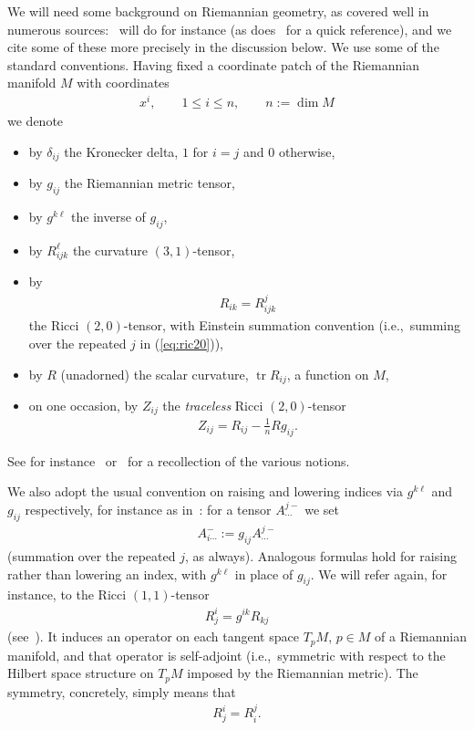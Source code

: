 \documentclass[pdftex]{sigma}%
\numberwithin{equation}{section}
\begin{document}
We will need some background on Riemannian geometry, as covered well in numerous sources:~\cite{berg-pan,bes,doC92,kn1,pet} will do for instance (as does~\cite[Appendix A]{ck-ric} for a quick reference), and we cite some of these more precisely in the discussion below. We use some of the standard conventions. Having fixed a coordinate patch of the Riemannian manifold $M$ with coordinates
\begin{gather*}
 x^i,\qquad 1\le i\le n,\qquad n:=\dim M
\end{gather*}
we denote
\begin{itemize}\itemsep=0pt
\item by $\delta_{ij}$ the Kronecker delta, $1$ for $i=j$ and $0$ otherwise,
\item by $g_{ij}$ the Riemannian metric tensor,
\item by $g^{k\ell}$ the inverse of $g_{ij}$,
\item by $R_{ijk}^{\ell}$ the curvature $(3,1)$-tensor,
\item by
 \begin{gather}
 R_{ik} = R_{ijk}^j\label{eq:ric20}
 \end{gather}
 the Ricci $(2,0)$-tensor, with Einstein summation convention (i.e.,~summing over the repe\-ated $j$ in (\ref{eq:ric20})),
\item by $R$ (unadorned) the scalar curvature, $\operatorname{tr} R_{ij}$, a function on $M$,
\item on one occasion, by $Z_{ij}$ the {\it traceless} Ricci $(2,0)$-tensor
 \begin{gather}\label{eq:trric}
 Z_{ij} = R_{ij} - \frac{1}{n} R g_{ij}.
 \end{gather}
\end{itemize}
See for instance~\cite[Chapter~1]{bes} or~\cite[Chapter~3]{pet} for a recollection of the various notions.


We also adopt the usual convention on raising and lowering indices via $g^{k\ell}$ and $g_{ij}$ respectively, for instance as in~\cite[Section~1.42]{bes}: for a tensor $A_{\cdots}^{j -}$ we set
\begin{gather*}
 A_{i\cdots}^{-}:=g_{ij}A_{\cdots}^{j -}
\end{gather*}
(summation over the repeated $j$, as always). Analogous formulas hold for raising rather than lowering an index, with $g^{k\ell}$ in place of $g_{ij}$. We will refer again, for instance, to the Ricci $(1,1)$-tensor
\begin{gather*}
 R^i_j = g^{ik}R_{kj}
\end{gather*}
(see~\cite[Remark 1.91]{bes}). It induces an operator on each tangent space $T_pM$, $p\in M$ of a Riemannian manifold, and that operator is self-adjoint (i.e.,~symmetric with respect to the Hilbert space structure on $T_pM$ imposed by the Riemannian metric). The symmetry, concretely, simply means that
\begin{gather*}
 R^i_j = R_i^j.
\end{gather*}
\end{document}
